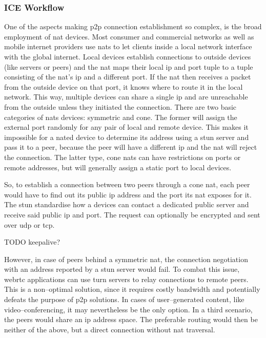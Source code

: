\subsubsection{ICE Workflow}
One of the aspects making \gls{p2p} connection establishment so complex, is the broad employment of \gls{nat} devices. Most consumer and commercial networks as well as mobile internet providers use \glspl{nat} to let clients inside a local network interface with the global internet. Local devices establish connections to outside devices (like servers or peers) and the \gls{nat} maps their local \gls{ip} and port tuple to a tuple consisting of the \gls{nat}'s \gls{ip} and a different port. If the \gls{nat} then receives a packet from the outside device on that port, it knows where to route it in the local network. This way, multiple devices can share a single \gls{ip} and are unreachable from the outside unless they initiated the connection. There are two basic categories of \glspl{nat} devices: symmetric and cone. The former will assign the external port randomly for any pair of local and remote device. This makes it impossible for a \gls{nat}ed device to determine its address using a stun server and pass it to a peer, because the peer will have a different \gls{ip} and the \gls{nat} will reject the connection. The latter type, cone \glspl{nat} can have restrictions on ports or remote addresses, but will generally assign a static port to local devices.

So, to establish a connection between two peers through a cone \gls{nat}, each peer would have to find out its public \gls{ip} address and the port its \gls{nat} exposes for it. The \gls{stun} standardise how a devices can contact a dedicated public server and receive said public \gls{ip} and port. The request can optionally be encrypted and sent over \gls{udp} or \gls{tcp}.

TODO keepalive?

However, in case of peers behind a symmetric \gls{nat}, the connection negotiation with an address reported by a \gls{stun} server would fail. To combat this issue, \gls{webrtc} applications can use \gls{turn} servers to relay connections to remote peers. This is a non–optimal solution, since it requires costly bandwidth and potentially defeats the purpose of \gls{p2p} solutions. In cases of user–generated content, like video–conferencing, it may nevertheless be the only option.
In a third scenario, the peers would share an \gls{ip} address space. The preferable routing would then be neither of the above, but a direct connection without \gls{nat} traversal.

